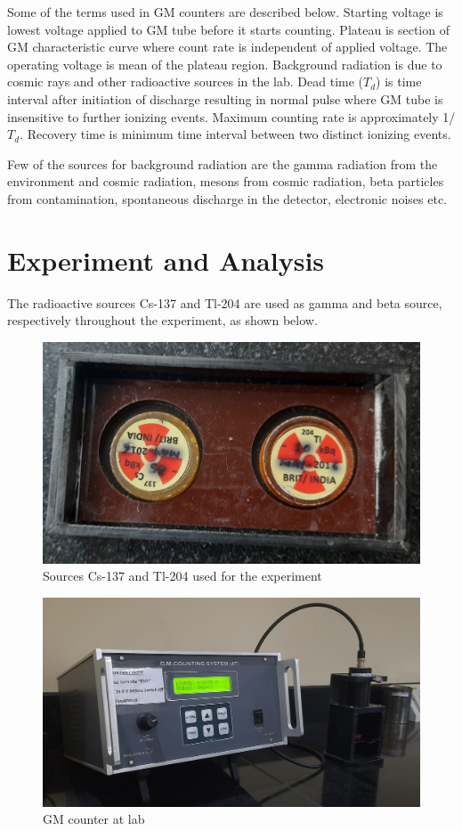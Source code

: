 \documentclass[a4paper, amsfonts, amssymb, amsmath, reprint, showkeys, nofootinbib, twoside]{revtex4-1}
\begin{document}
Some of the terms used in GM counters are described below.
Starting voltage is lowest voltage applied to GM tube before it starts counting. Plateau is section of GM characteristic curve where count rate is independent of applied voltage. The operating voltage is mean of the plateau region. Background radiation is due to cosmic rays and other radioactive sources in the lab. Dead time ($T_d$) is time interval after initiation of discharge resulting in normal pulse where GM tube is insensitive to further ionizing events. Maximum counting rate is approximately 1/$T_d$. Recovery time is minimum time interval between two distinct ionizing events. 

Few of the sources for background radiation are the gamma radiation from the environment and cosmic radiation, mesons from cosmic radiation, beta particles from contamination, spontaneous discharge in the detector, electronic noises etc. 

\section{Experiment and Analysis}
The radioactive sources Cs-137 and Tl-204 are used as gamma and beta source, respectively throughout the experiment, as shown below.

\begin{figure}[H]
	\centering
	\includegraphics[scale=0.09]{source} 
	\caption{Sources Cs-137 and Tl-204 used for the experiment}
	\label{}
\end{figure}

\begin{figure}[H]
	\centering
	\includegraphics[scale=0.07]{gmc} 
	\caption{GM counter at lab}
	\label{}
\end{figure}
\end{document}

